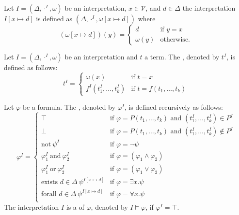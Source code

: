Let $I=(\Delta,\cdot^I,\omega)$ be an interpretation, $x\in\mathcal{V}$, and $d\in\Delta$ the interpretation $I\left[x\mapsto d\right]$ is defined as $(\Delta,\cdot^I,\omega\left[x\mapsto d\right])$ where
\[(\omega\left[x\mapsto d\right])(y)=
	\begin{cases}
		d         & \text{if $y=x$}   \\
		\omega(y) & \text{otherwise.} 
	\end{cases}\]
\begin{definition}
	Let $I=(\Delta,\cdot^I,\omega)$ be an interpretation and $t$ a term. The , denoted by $t^I$, is defined as follows:
	\[t^I=
		\begin{cases}
			\omega(x)              & \text{if $t=x$}                \\
			f^I(t^I_1,\dots,t^I_k) & \text{if $t=f(t_1,\dots,t_k)$} 
		\end{cases}\]
		
	Let $\varphi$ be a formula. The , denoted by $\varphi^I$, is defined recursively as follows:
	\[\varphi^I=
		\begin{cases}
			\top                                                   & \text{if $\varphi=P(t_1,\dots,t_k)$ and $(t^I_1,\dots,t^I_k)\in P^I$}    \\
			\bot                                                   & \text{if $\varphi=P(t_1,\dots,t_k)$ and $(t^I_1,\dots,t^I_k)\notin P^I$} \\
			\text{not}~\psi^I                                      & \text{if $\varphi=\neg\psi$}                                             \\
			\varphi^I_1~\text{and}~\varphi^I_2                     & \text{if $\varphi=(\varphi_1\wedge\varphi_2)$}                           \\
			\varphi^I_1~\text{or}~\varphi^I_2                      & \text{if $\varphi=(\varphi_1\vee\varphi_2)$}                             \\
			\text{exists $d\in\Delta$}~\psi^{I\left[x\mapsto d\right]} & \text{if $\varphi=\exists x.\psi$}                                        \\
			\text{forall $d\in\Delta$}~\psi^{I\left[x\mapsto d\right]} & \text{if $\varphi=\forall x.\psi$}                                        \\
		\end{cases}\]
	The interpretation $I$ is a  of $\varphi$, denoted by $I\models\varphi$, if $\varphi^I=\top$.
\end{definition}
